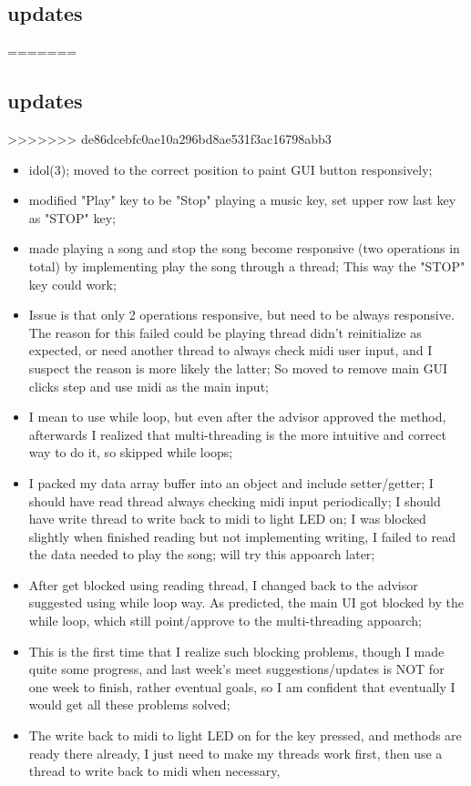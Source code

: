 \documentclass[9pt,b5paper]{article}
\begin{document}
\subsection{updates}
\label{sec-5-1}
=======
\label{sec-4}
\subsection{updates}
\label{sec-4-1}
>>>>>>> de86dcebfc0ae10a296bd8ae531f3ac16798abb3
\begin{itemize}
\item idol(3); moved to the correct position to paint GUI button responsively;
\item modified "Play" key to be "Stop" playing a music key, set upper row last key as "STOP" key;
\item made playing a song and stop the song become responsive (two operations in total) by implementing play the song through a thread; This way the "STOP" key could work;
\item Issue is that only 2 operations responsive, but need to be always responsive. The reason for this failed could be playing thread didn't reinitialize as expected, or need another thread to always check midi user input, and I suspect the reason is more likely the latter; So moved to remove main GUI clicks step and use midi as the main input;
\item I mean to use while loop, but even after the advisor approved the method, afterwards I realized that multi-threading is the more intuitive and correct way to do it, so skipped while loops;
\item I packed my data array buffer into an object and include setter/getter; I should have read thread always checking midi input periodically; I should have write thread to write back to midi to light LED on; I was blocked slightly when finished reading but not implementing writing, I failed to read the data needed to play the song; will try this appoarch later;
\item After get blocked using reading thread, I changed back to the advisor suggested using while loop way. As predicted, the main UI got blocked by the while loop, which still point/approve to the multi-threading appoarch;
\item This is the first time that I realize such blocking problems, though I made quite some progress, and last week's meet suggestions/updates is NOT for one week to finish, rather eventual goals, so I am confident that eventually I would get all these problems solved;
\item The write back to midi to light LED on for the key pressed, and methods are ready there already, I just need to make my threads work first, then use a thread to write back to midi when necessary,
\end{itemize}
\end{document}
